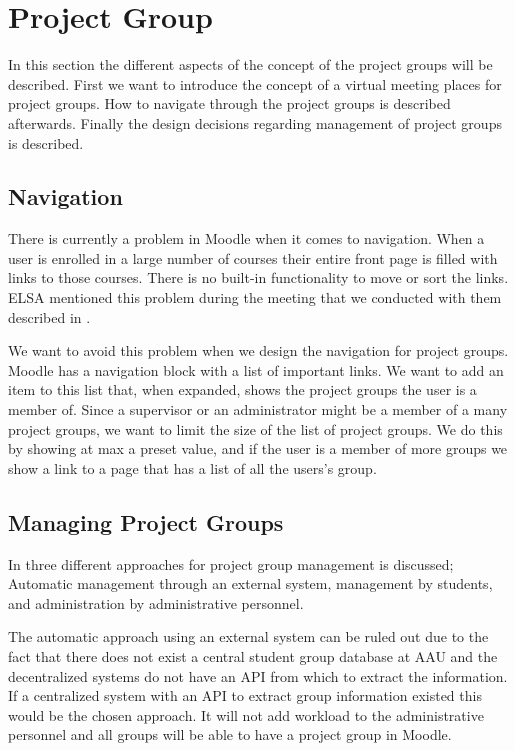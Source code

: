 \section{Project Group}
\label{sec:projectgroup}
In this section the different aspects of the concept of the project groups will be described.
First we want to introduce the concept of a virtual meeting places for project groups.
How to navigate through the project groups is described afterwards.
Finally the design decisions regarding management of project groups is described.



\subsection{Navigation}
\label{sub:designprojectgroupnavigation}
There is currently a problem in Moodle when it comes to navigation. 
When a user is enrolled in a large number of courses their entire front page is filled with links to those courses.
There is no built-in functionality to move or sort the links.
ELSA mentioned this problem during the meeting that we conducted with them described in .

We want to avoid this problem when we design the navigation for project groups.
Moodle has a navigation block with a list of important links.
We want to add an item to this list that, when expanded, shows the project groups the user is a member of.
Since a supervisor or an administrator might be a member of a many project groups, we want to limit the size of the list of project groups.
We do this by showing at max a preset value, and if the user is a member of more groups we show a link to a page that has a list of all the users's group.

\subsection{Managing Project Groups}
In  three different approaches for project group management is discussed; Automatic management through an external system, management by students, and administration by administrative personnel. 

The automatic approach using an external system can be ruled out due to the fact that there does not exist a central student group database at AAU and the decentralized systems do not have an API from which to extract the information.
If a centralized system with an API to extract group information existed this would be the chosen approach.
It will not add workload to the administrative personnel and all groups will be able to have a project group in Moodle. 

